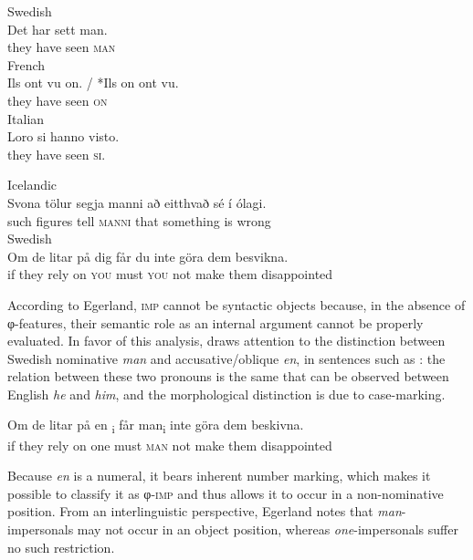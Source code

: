 \documentclass[output=paper]{langscibook}
\begin{document}
\ea\label{ex:avelar:12}\citep[91]{Egerland2003}
 \ea Swedish\\
 \gll * Det har sett man.\\
       {}  they have seen \textsc{man}\\
 \ex French\\
 \gll * Ils ont vu on. / *Ils on ont vu.\\
       {}  they have seen \textsc{on}\\
 \ex Italian\\
 \gll  * Loro si hanno visto.\\
       {}  they have seen \textsc{si}.\\
\z
\ex\label{ex:avelar:13}\citep[91]{Egerland2003}
 \begin{xlist}
   Icelandic\\
   \gll Svona tölur   segja   manni     að eitthvað {sé í} ólagi.\\
         such figures   tell   \textsc{manni} that something is wrong\\
   Swedish\\
   \gll  Om de   litar   på   dig   får     du     inte göra   dem   besvikna.\\
         if they     rely   on   \textsc{you} must \textsc{you} not make  them  disappointed\\
\end{xlist}  
\z 

According to Egerland, \textsc{imp} cannot be syntactic objects because, in the absence of φ-fea\-tures, their semantic role as an internal argument cannot be properly evaluated. In favor of this analysis, \citet{Egerland2003} draws attention to the distinction between Swedish nominative \textit{man} {and accusative/oblique} {\textit{en}}{, in sentences such as : the relation between these two pronouns is the same that can be observed between English} {\textit{he} }{and} {\textit{him}}{, and the morphological distinction is due to case-marking.}

\ea\label{ex:avelar:14}
 \gll Om de   litar   på   {en \textsubscript{i}} får {{man}\textsubscript{i}} inte göra   dem   beskivna.\\
         if they     rely   on   one   must   \textsc{man}   not make   them   disappointed\\
\z 

{Because} {\textit{en}} {is a numeral, it bears inherent number marking, which makes it possible to classify it as φ-\textsc{imp} and thus allows it to occur in a non-nominative position. From an interlinguistic perspective, Egerland notes that} {\textit{man}}{{}-impersonals may not occur in an object position, whereas} {\textit{one}}{{}-impersonals suffer no such restriction.}
\end{document}
